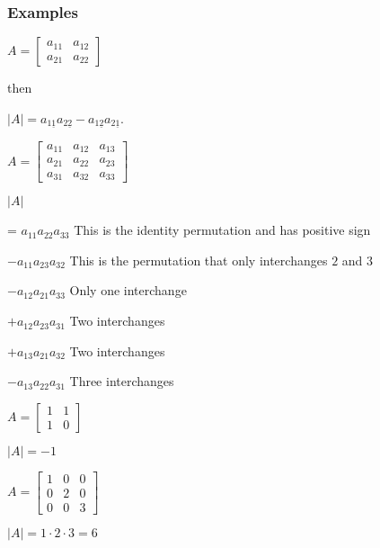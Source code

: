 \documentclass[12pt,a4paper]{article}
\theoremstyle{regla}
\theoremstyle{remark}
\theoremstyle{definition}
\theoremstyle{nonumberbreak}
\begin{document}
\subsubsection{Examples}
\begin{xmpl}

$A=
\begin{bmatrix}
a_{11} & a_{12}  \\
a_{21} & a_{22} 
\end{bmatrix}$

then

$\vert A \vert = a_{1\underline{1}} a_{2\underline{2}} - a_{1\underline{2}}a_{2\underline{1}}$.
\end{xmpl}
\begin{xmpl}


$A=
\begin{bmatrix}
a_{11} & a_{12} & a_{13}  \\
a_{21} & a_{22} & a_{23} \\
a_{31} & a_{32} & a_{33}
\end{bmatrix}$

                                                
$\vert A \vert$ 

=  $a_{11} a_{22} a_{33}$   This is the identity permutation and has positive sign

  $-a_{11} a_{23} a_{32}$   This is the permutation that only interchanges $2$ and $3$

  $-a_{12} a_{21} a_{33}$   Only one interchange

  $+a_{12} a_{23} a_{31}$   Two interchanges

  $+a_{13} a_{21} a_{32}$   Two interchanges

  $-a_{13} a_{22} a_{31}$   Three interchanges
\end{xmpl}
\begin{xmpl}


$A=
\begin{bmatrix}
1 & 1  \\
1 & 0 
\end{bmatrix}$

$\vert A \vert = -1$

\end{xmpl}
\begin{xmpl}

$A=
\begin{bmatrix}
1 & 0 & 0  \\
0 & 2 & 0  \\
0 & 0 & 3 
\end{bmatrix}$

$\vert A \vert = 1 \cdot 2 \cdot 3 = 6$
\end{xmpl}
\end{document}
